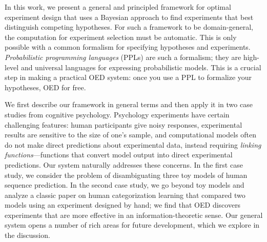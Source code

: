 \documentclass{article}
\newcommand{\ndg}[1]{\textcolor{Green}{[ndg: #1]}}
\begin{document}
In this work, we present a general and principled framework for optimal experiment design that uses a Bayesian approach to find experiments that best distinguish competing hypotheses.
For such a framework to be domain-general, the computation for experiment selection must be automatic.
This is only possible with a common formalism for specifying hypotheses and experiments.
\emph{Probabilistic programming languages} (PPLs) are such a formalism; they are high-level and universal languages for expressing probabilistic models.
This is a crucial step in making a practical OED system: once you use a PPL to formalize your hypotheses, OED for free.

We first describe our framework in general terms and then apply it in two case studies from cognitive psychology.
Psychology experiments have certain challenging features: human participants give noisy responses, experimental results are sensitive to the size of one's sample, and computational models often do not make direct predictions about experimental data, instead requiring \emph{linking functions}---functions that convert model output into direct experimental predictions.
Our system naturally addresses these concerns.
In the first case study, we consider the problem of disambiguating three toy models of human sequence prediction.
In the second case study, we go beyond toy models and analyze a classic paper on human categorization learning that compared two models using an experiment designed by hand; we find that OED discovers experiments that are more effective in an information-theoretic sense.
Our general system opens a number of rich areas for future development, which we explore in the discussion.

\end{document}
